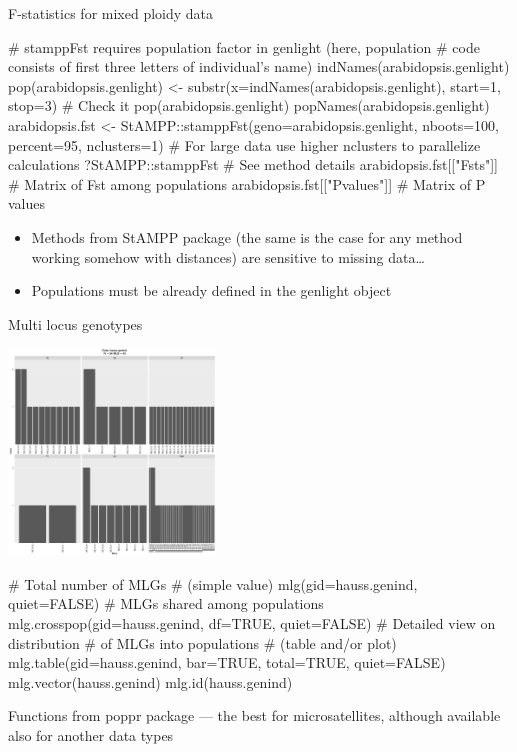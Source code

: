 \documentclass[compress, ucs, xelatex, 11pt, xcolor=svgnames,
	hyperref={
		bookmarks=true,
		unicode=true,
		colorlinks=true,
		pdftitle={Molecular data in R},
		plainpages=false,
		pdfauthor={Vojtech Zeisek},
		pdfsubject={Course about phylogeny and evolution in R},
		pdfcreator={XeLaTeX},
		pdfkeywords={R, evolution, phylogeny, molecular data},
		linkcolor=Tomato,
		anchorcolor=SaddleBrown,
		citecolor=Goldenrod,
		filecolor=DarkMagenta,
		menucolor=Sienna,
		urlcolor=DarkTurquoise,
		pdftex},
	url={hyphens, lowtilde} %
	]{beamer}
\begin{document}
\begin{frame}[fragile]{F-statistics for mixed ploidy data}
	\begin{spluscode}
    # stamppFst requires population factor in genlight (here, population
    # code consists of first three letters of individual's name)
    indNames(arabidopsis.genlight)
    pop(arabidopsis.genlight) <- substr(x=indNames(arabidopsis.genlight),
      start=1, stop=3)
    # Check it
    pop(arabidopsis.genlight)
    popNames(arabidopsis.genlight)
    arabidopsis.fst <- StAMPP::stamppFst(geno=arabidopsis.genlight,
      nboots=100, percent=95, nclusters=1)
    # For large data use higher nclusters to parallelize calculations
    ?StAMPP::stamppFst # See method details
    arabidopsis.fst[["Fsts"]] # Matrix of Fst among populations
    arabidopsis.fst[["Pvalues"]] # Matrix of P values
	\end{spluscode}
	\begin{itemize}
		\item Methods from StAMPP package (the same is the case for any method working somehow with distances) are sensitive to missing data\ldots
		\item Populations must be already defined in the genlight object
	\end{itemize}
\end{frame}


\begin{frame}[fragile]{Multi locus genotypes}
	\begin{multicols}{2}
		\includegraphics[height=5.5cm]{mlg.png}
		\begin{spluscode}
    # Total number of MLGs
    # (simple value)
    mlg(gid=hauss.genind, quiet=FALSE)
    # MLGs shared among populations
    mlg.crosspop(gid=hauss.genind,
      df=TRUE, quiet=FALSE)
    # Detailed view on distribution
    # of MLGs into populations
    # (table and/or plot)
    mlg.table(gid=hauss.genind,
      bar=TRUE, total=TRUE,
      quiet=FALSE)
    mlg.vector(hauss.genind)
    mlg.id(hauss.genind)
		\end{spluscode}
	\end{multicols}
	Functions from poppr package --- the best for microsatellites, although available also for another data types
\end{frame}
\end{document}
